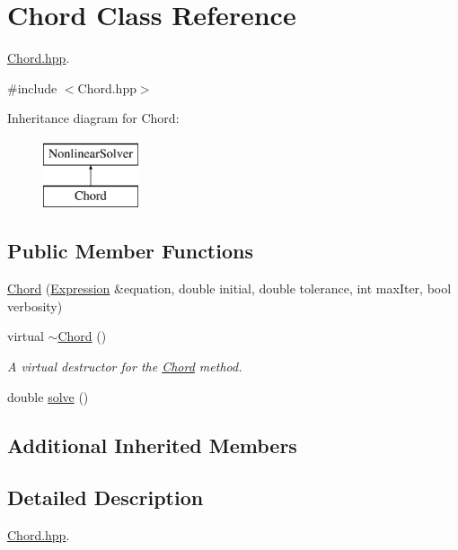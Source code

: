 \hypertarget{class_chord}{}\section{Chord Class Reference}
\label{class_chord}


\hyperlink{_chord_8hpp_source}{Chord.\+hpp}.  




{\ttfamily \#include $<$Chord.\+hpp$>$}

Inheritance diagram for Chord\+:\begin{figure}[H]
\begin{center}
\leavevmode
\includegraphics[height=2.000000cm]{class_chord}
\end{center}
\end{figure}
\subsection*{Public Member Functions}
\begin{DoxyCompactItemize}
\item 
\hyperlink{class_chord_a276152dc216ada11e924b9ddac8b6260}{Chord} (\hyperlink{class_expression}{Expression} \&equation, double initial, double tolerance, int max\+Iter, bool verbosity)
\item 
virtual \hyperlink{class_chord_ac1ed7ca66d87b80a1a98e6981b5e6b9e}{$\sim$\+Chord} ()\hypertarget{class_chord_ac1ed7ca66d87b80a1a98e6981b5e6b9e}{}\label{class_chord_ac1ed7ca66d87b80a1a98e6981b5e6b9e}

\begin{DoxyCompactList}\small\item\em A virtual destructor for the \hyperlink{class_chord}{Chord} method. \end{DoxyCompactList}\item 
double \hyperlink{class_chord_a984ae41890e938218b3820ff429ad69e}{solve} ()
\end{DoxyCompactItemize}
\subsection*{Additional Inherited Members}


\subsection{Detailed Description}
\hyperlink{_chord_8hpp_source}{Chord.\+hpp}. 

